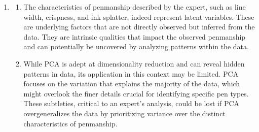 \documentclass[submit]{harvardml}
\begin{document}
\begin{enumerate}
  \item \begin{enumerate}
      \item The characteristics of penmanship described by the expert, such as line width, crispness, and ink splatter, indeed represent latent variables. These are underlying factors that are not directly observed but inferred from the data. They are intrinsic qualities that impact the observed penmanship and can potentially be uncovered by analyzing patterns within the data.
      \item While PCA is adept at dimensionality reduction and can reveal hidden patterns in data, its application in this context may be limited. PCA focuses on the variation that explains the majority of the data, which might overlook the finer details crucial for identifying specific pen types. These subtleties, critical to an expert's analysis, could be lost if PCA overgeneralizes the data by prioritizing variance over the distinct characteristics of penmanship.
  \end{enumerate}
\end{enumerate}
\end{document}

